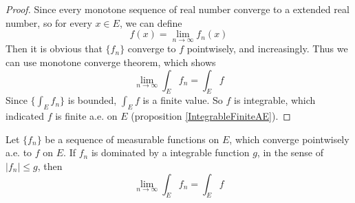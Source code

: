 \documentclass[lang=en, 12pt]{elegantbook}
\begin{document}
        \begin{proof}
            Since every monotone sequence of real number converge to a extended real number, so for every $x\in E$, we can define 
            $$f(x) = \lim_{n\to \infty} f_n (x)$$
        Then it is obvious that $\{f_n\}$ converge to $f$ pointwisely, and increasingly. Thus we can use monotone converge theorem, which shows
            $$\lim_{n\to \infty} \int_E f_n = \int_E f$$
            Since $\{\int_E f_n\}$ is bounded, $\int_E f$ is a finite value. So $f$ is integrable, which indicated $f$ is finite a.e. on $E$
            (proposition \ref{IntegrableFiniteAE}).
        \end{proof}
        \begin{theorem}
            Let $\{f_n\}$ be a sequence of measurable functions on $E$, which converge pointwisely a.e. to $f$ on $E$. If $f_n$ is dominated 
        by a integrable function $g$, in the sense of $|f_n|\leq g$, then
            $$\lim_{n \to \infty} \int_E f_n = \int_E f$$
        \end{theorem}
\end{document}
